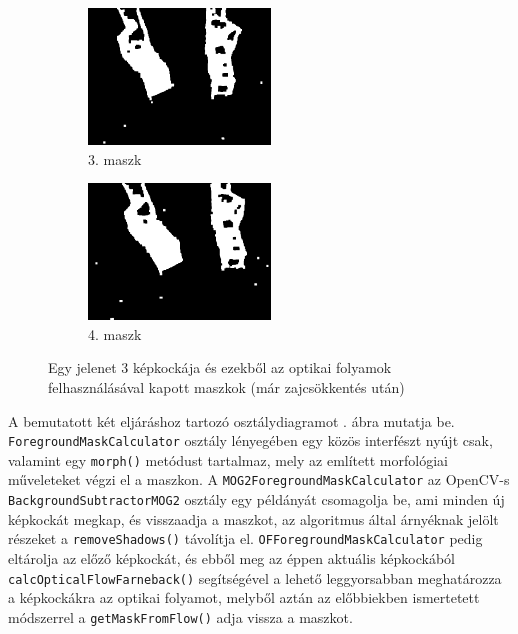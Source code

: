 \begin{figure}[tbh]
\begin{subfigure}[b]{.32\linewidth}
	\centering
	\includegraphics[width=137pt]{figures/mask_ofmask_104.png}
	\caption{3. maszk}
  \end{subfigure}
\begin{subfigure}[b]{.32\linewidth}
	\centering
	\includegraphics[width=137pt]{figures/mask_ofmask_107.png}
	\caption{4. maszk}
  \end{subfigure}
\caption{Egy jelenet 3 képkockája és ezekből az optikai folyamok felhasználásával kapott maszkok (már zajcsökkentés után) \label{fig:of_mask}}
\end{figure}


A bemutatott két eljáráshoz tartozó osztálydiagramot . ábra mutatja be. \texttt{ForegroundMaskCalculator} osztály lényegében egy közös interfészt nyújt csak, valamint egy \texttt{morph()} metódust tartalmaz, mely az említett morfológiai műveleteket végzi el a maszkon. A \texttt{MOG2ForegroundMaskCalculator} az OpenCV-s \texttt{BackgroundSubtractorMOG2} osztály egy példányát csomagolja be, ami minden új képkockát megkap, és visszaadja a maszkot, az algoritmus által árnyéknak jelölt részeket a \texttt{removeShadows()} távolítja el. \texttt{OFForegroundMaskCalculator} pedig eltárolja az előző képkockát, és ebből meg az éppen aktuális képkockából \texttt{calcOpticalFlowFarneback()} segítségével a lehető leggyorsabban meghatározza a képkockákra az optikai folyamot, melyből aztán az előbbiekben ismertetett módszerrel a \texttt{getMaskFromFlow()} adja vissza a maszkot.

